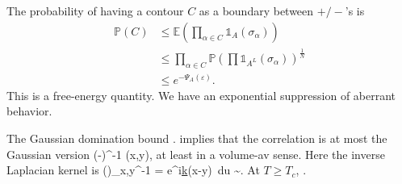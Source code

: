 
The probability of having a contour $C$ as a boundary between $+/-$'s is 
\begin{align}
\mathbb{P}(C) &\le \mathbb{E}\left( {\prod_{\alpha\in C} \mathds{1}_A (\sigma_\alpha)} \right)\\
&\le \prod_{\alpha\in C}\mathbb{P}\left( {\prod \mathds{1}_{A^L} (\sigma_\alpha)} \right)^{\frac{1}{N}}\\
&\le e^{-\Psi_A(\varepsilon)}.
\end{align}
This is a free-energy quantity. We have an exponential suppression of aberrant behavior.

The Gaussian domination bound 
\be
\left{}\right\rangle \le {}.
\ee
implies that the correlation is at most the Gaussian version
\be
\left{}\right\rangle\le (-\Delta)^{-1} (x,y),
\ee
at least in a volume-av sense.
Here the inverse Laplacian kernel is
\be
(\Delta)_{x,y}^{-1} = \int e^{i\underline{k}(x-y)}  \,du \sim {}.
\ee
At $T\ge T_c$, 
\be
\left{}\right\rangle \le {}.
\ee

